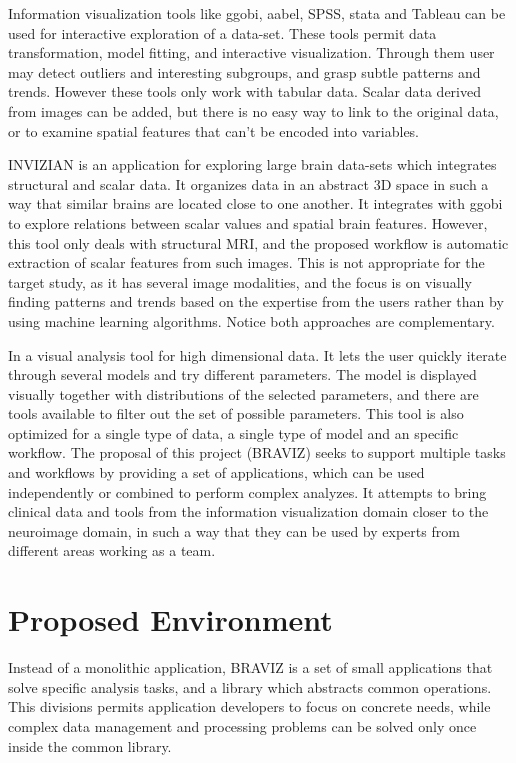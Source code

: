 \documentclass[utf8,paper]{frontiersSCNS} %
\begin{document}
Information visualization tools like ggobi\citep{cook_interactive_2007}, aabel, SPSS, stata and Tableau\citep{hanrahan_tableau_2003} can be used for interactive exploration of a data-set. These tools permit data transformation, model fitting, and interactive visualization. Through them user may detect outliers and interesting subgroups, and grasp subtle patterns and trends. However these tools only work with tabular data. Scalar data derived from images can be added, but there is no easy way to link to the original data, or to examine spatial features that can't be encoded into variables. 

INVIZIAN \citep{bowman_query-based_2011,bowman_feature-similarity_2012,bowman_visual_2012} is an application for exploring large brain data-sets which integrates structural and scalar data. It organizes data in an abstract 3D space in such a way that similar brains are located close to one another. It integrates with ggobi to explore relations between scalar values and spatial brain features. However, this tool only deals with structural MRI, and the proposed workflow is automatic extraction of scalar features from such images. This is not appropriate for the target study, as it has several image modalities, and the focus is on visually finding patterns and trends based on the expertise from the users rather than by using machine learning algorithms. Notice both approaches are complementary.

In \citep{hinterberg_peax:_2014} a visual analysis tool for high dimensional data. It lets the user quickly iterate through several models and try different parameters. The model is displayed visually together with distributions of the selected parameters, and there are tools available to filter out the set of possible parameters. This tool is also optimized for a single type of data, a single type of model and an specific workflow. The proposal of this project (BRAVIZ) seeks to support multiple tasks and workflows by providing a set of applications, which can be used independently or combined to perform complex analyzes. It attempts to bring clinical data and tools from the information visualization domain closer to the neuroimage domain, in such a way that they can be used by experts from different areas working as a team.


\section{Proposed Environment}

Instead of a monolithic application, BRAVIZ is a set of small applications that solve specific analysis tasks, and a library which abstracts common operations. This divisions permits application developers to focus on concrete needs, while complex data management and processing problems can be solved only once inside the common library. 
\end{document}
